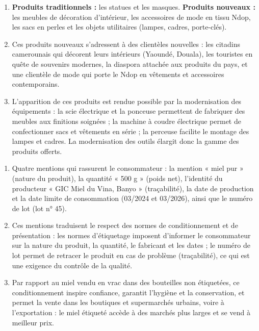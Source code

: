 \documentclass[11pt]{article}
\begin{document}
\begin{corrige}
\begin{enumerate}
\item \textbf{Produits traditionnels :} les statues et les masques. \textbf{Produits nouveaux :} les meubles de décoration d'intérieur, les accessoires de mode en tissu Ndop, les sacs en perles et les objets utilitaires (lampes, cadres, porte-clés).

\item Ces produits nouveaux s'adressent à des clientèles nouvelles : les citadins camerounais qui décorent leurs intérieurs (Yaoundé, Douala), les touristes en quête de souvenirs modernes, la diaspora attachée aux produits du pays, et une clientèle de mode qui porte le Ndop en vêtements et accessoires contemporains.

\item L'apparition de ces produits est rendue possible par la modernisation des équipements : la scie électrique et la ponceuse permettent de fabriquer des meubles aux finitions soignées ; la machine à coudre électrique permet de confectionner sacs et vêtements en série ; la perceuse facilite le montage des lampes et cadres. La modernisation des outils élargit donc la gamme des produits offerts.
\end{enumerate}
\end{corrige}

\begin{corrige}
\begin{enumerate}
\item Quatre mentions qui rassurent le consommateur : la mention « miel pur » (nature du produit), la quantité « 500 g » (poids net), l'identité du producteur « GIC Miel du Vina, Banyo » (traçabilité), la date de production et la date limite de consommation (03/2024 et 03/2026), ainsi que le numéro de lot (lot n° 45).

\item Ces mentions traduisent le respect des normes de conditionnement et de présentation : les normes d'étiquetage imposent d'informer le consommateur sur la nature du produit, la quantité, le fabricant et les dates ; le numéro de lot permet de retracer le produit en cas de problème (traçabilité), ce qui est une exigence du contrôle de la qualité.

\item Par rapport au miel vendu en vrac dans des bouteilles non étiquetées, ce conditionnement inspire confiance, garantit l'hygiène et la conservation, et permet la vente dans les boutiques et supermarchés urbains, voire à l'exportation : le miel étiqueté accède à des marchés plus larges et se vend à meilleur prix.
\end{enumerate}
\end{corrige}
\end{document}
